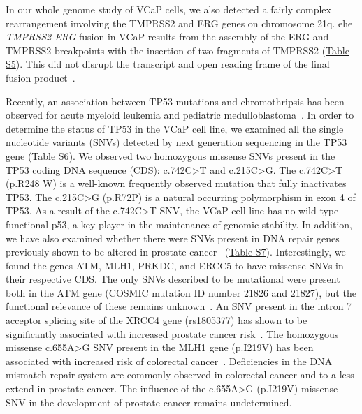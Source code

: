 In our whole genome study of VCaP cells, we also detected a fairly complex rearrangement involving the TMPRSS2 and ERG genes on chromosome 21q\@.
ehe \textit{TMPRSS2-ERG} fusion in VCaP results from the assembly of the ERG and TMPRSS2 breakpoints with the insertion of two fragments of TMPRSS2 (\href{https://link.springer.com/article/10.1007/s00439-013-1308-1#SupplementaryMaterial}{Table S5}).
This did not disrupt the transcript and open reading frame of the final fusion product~\cite{mertz2007molecular}.

Recently, an association between TP53 mutations and chromothripsis has been observed for acute myeloid leukemia and pediatric
medulloblastoma~\cite{rausch2012genome}. In order to determine the status of TP53 in the VCaP cell line, we examined all the single
nucleotide variants (SNVs) detected by next generation sequencing in the TP53 gene (\href{https://link.springer.com/article/10.1007/s00439-013-1308-1#SupplementaryMaterial}{Table S6}). We observed two homozygous missense
SNVs present in the TP53 coding DNA sequence (CDS): c.742C>T and c.215C>G. The c.742C>T (p.R248 W) is a well-known frequently
observed mutation that fully inactivates TP53. The c.215C>G (p.R72P) is a natural occurring polymorphism in exon 4 of TP53.
As a result of the c.742C>T SNV, the VCaP cell line has no wild type functional p53, a key player in the maintenance of genomic
stability. In addition, we have also examined whether there were SNVs present in DNA repair genes previously shown to be altered
in prostate cancer~\cite{grasso2012mutational} (\href{https://link.springer.com/article/10.1007/s00439-013-1308-1#SupplementaryMaterial}{Table S7}). Interestingly, we found the genes ATM, MLH1, PRKDC, and ERCC5 to have missense
SNVs in their respective CDS\@. The only SNVs described to be mutational were present both in the ATM gene (COSMIC mutation ID number
21826 and 21827), but the functional relevance of these remains unknown~\cite{gumy2006atm}. An SNV present in the intron 7
acceptor splicing site of the XRCC4 gene (rs1805377) has shown to be significantly associated with increased prostate cancer risk~\cite{mandal2011polymorphisms}. The homozygous missense c.655A>G SNV present in the MLH1 gene (p.I219V) has been associated with increased
risk of colorectal cancer~\cite{campbell2009mismatch}. Deficiencies in the DNA mismatch repair system are commonly observed in colorectal
cancer and to a less extend in prostate cancer. The influence of the c.655A>G (p.I219V) missense SNV in the development of prostate
cancer remains undetermined.

